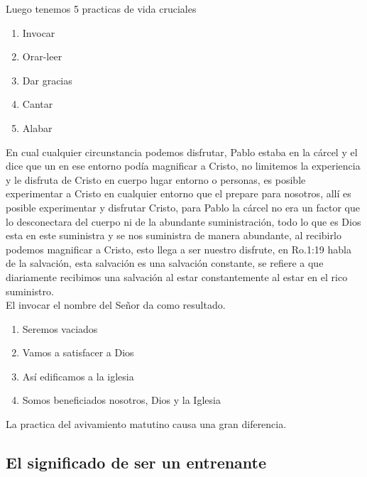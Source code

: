 \documentclass[12pt]{article}
\begin{document}
Luego tenemos 5 practicas de vida cruciales 

\begin{enumerate}
\item Invocar

\item Orar-leer

\item Dar gracias

\item Cantar

\item Alabar

\end{enumerate}

En cual cualquier circunstancia podemos disfrutar, Pablo estaba en la cárcel y el dice que un en ese entorno podía magnificar a Cristo, no limitemos la experiencia y le disfruta de Cristo en cuerpo lugar entorno o personas, es posible experimentar a Cristo en cualquier entorno que el prepare para nosotros, allí es posible experimentar y disfrutar Cristo, para Pablo la cárcel no era un factor que lo desconectara del cuerpo ni de la abundante suministración, todo lo que es Dios esta en este suministra y se nos suministra de manera abundante, al recibirlo podemos magnificar a Cristo, esto llega a ser nuestro disfrute, en Ro.1:19 habla de la salvación, esta salvación es una salvación constante, se refiere a que diariamente recibimos una salvación al estar constantemente al estar en el rico suministro. \\

El invocar el nombre del Señor da como resultado.\\

\begin{enumerate}
\item Seremos vaciados

\item Vamos a satisfacer a Dios

\item Así edificamos a la iglesia

\item Somos beneficiados nosotros, Dios y la Iglesia 

\end{enumerate}

La practica del avivamiento matutino causa una gran diferencia.

\subsection*{El significado de ser un entrenante}
\end{document}
